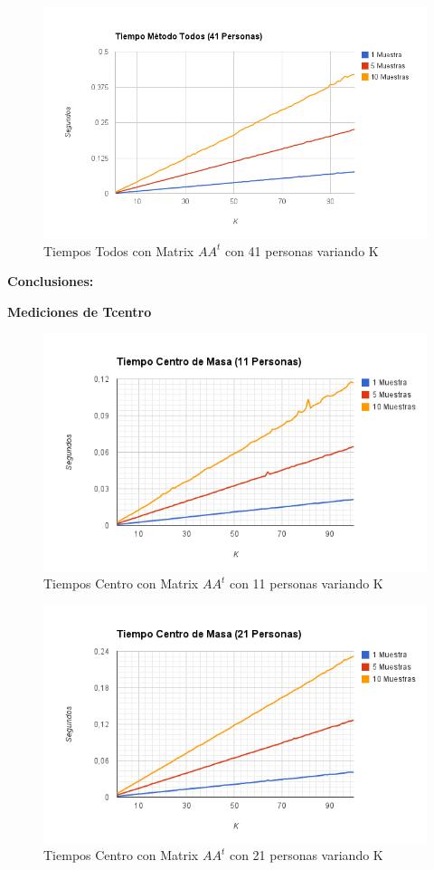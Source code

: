 \begin{figure}[H]
\includegraphics[width=1\textwidth]{img/imagef.png}
     \caption{Tiempos Todos con Matrix $AA^t$ con 41 personas variando K}
\end{figure}

\textbf{Conclusiones:}

\textbf{Mediciones de Tcentro }

\begin{figure}[H]
\includegraphics[width=1\textwidth]{img/imageg.png}
     \caption{Tiempos Centro con Matrix $AA^t$ con 11 personas variando K}
\end{figure}

\begin{figure}[H]
\includegraphics[width=1\textwidth]{img/imageh.png}
     \caption{Tiempos Centro con Matrix $AA^t$ con 21 personas variando K}
\end{figure}


